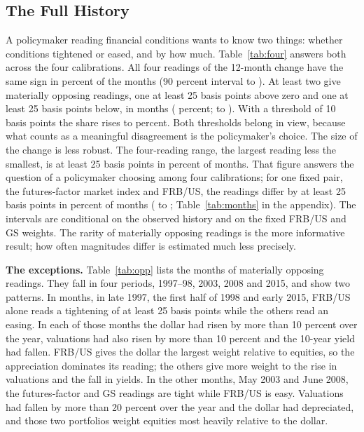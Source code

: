 \documentclass[11pt]{article}
\begin{document}
\subsection{The Full History}\label{sec:fullhist}
A policymaker reading financial conditions wants to know two things: whether conditions tightened or eased, and by how much. Table~\ref{tab:four} answers both across the four calibrations. All four readings of the 12-month change have the same sign in  percent of the  months (90 percent interval  to ). At least two give materially opposing readings, one at least 25 basis points above zero and one at least 25 basis points below, in  months ( percent;  to ). With a threshold of 10 basis points the share rises to  percent. Both thresholds belong in view, because what counts as a meaningful disagreement is the policymaker's choice. The size of the change is less robust. The four-reading range, the largest reading less the smallest, is at least 25 basis points in  percent of months. That figure answers the question of a policymaker choosing among four calibrations; for one fixed pair, the futures-factor market index and FRB/US, the readings differ by at least 25 basis points in  percent of months ( to ; Table~\ref{tab:months} in the appendix). The intervals are conditional on the observed history and on the fixed FRB/US and GS weights. The rarity of materially opposing readings is the more informative result; how often magnitudes differ is estimated much less precisely.



\textbf{The exceptions.} Table~\ref{tab:opp} lists the  months of materially opposing readings. They fall in four periods, 1997--98, 2003, 2008 and 2015, and show two patterns. In  months, in late 1997, the first half of 1998 and early 2015, FRB/US alone reads a tightening of at least 25 basis points while the others read an easing. In each of those months the dollar had risen by more than 10 percent over the year, valuations had also risen by more than 10 percent and the 10-year yield had fallen. FRB/US gives the dollar the largest weight relative to equities, so the appreciation dominates its reading; the others give more weight to the rise in valuations and the fall in yields. In the other  months, May 2003 and June 2008, the futures-factor and GS readings are tight while FRB/US is easy. Valuations had fallen by more than 20 percent over the year and the dollar had depreciated, and those two portfolios weight equities most heavily relative to the dollar.
\end{document}
